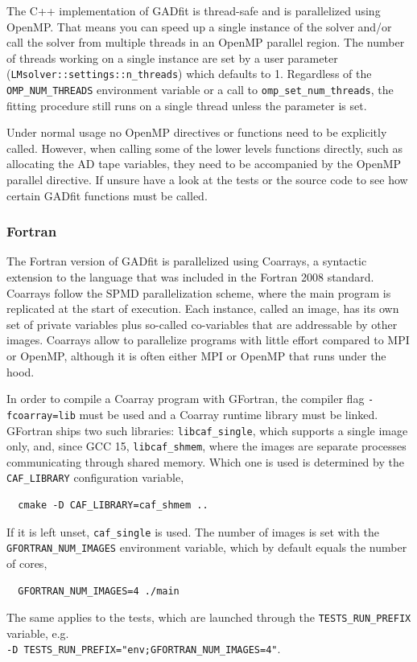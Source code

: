\documentclass{article}
\begin{document}
The C++ implementation of GADfit is thread-safe and is parallelized using OpenMP. That means you can speed up a single instance of the solver and/or call the solver from multiple threads in an OpenMP parallel region. The number of threads working on a single instance are set by a user parameter\\
(\verb+LMsolver::settings::n_threads+) which defaults to 1. Regardless of the \verb+OMP_NUM_THREADS+ environment variable or a call to \verb+omp_set_num_threads+, the fitting procedure still runs on a single thread unless the parameter is set.

Under normal usage no OpenMP directives or functions need to be explicitly called. However, when calling some of the lower levels functions directly, such as allocating the AD tape variables, they need to be accompanied by the OpenMP parallel directive. If unsure have a look at the tests or the source code to see how certain GADfit functions must be called.

\subsubsection{\label{sec:parallelism_fortran}Fortran}

The Fortran version of GADfit is parallelized using Coarrays, a syntactic extension to the language that was included in the Fortran 2008 standard. Coarrays follow the SPMD parallelization scheme, where the main program is replicated at the start of execution. Each instance, called an image, has its own set of private variables plus so-called co-variables that are addressable by other images. Coarrays allow to parallelize programs with little effort compared to MPI or OpenMP, although it is often either MPI or OpenMP that runs under the hood.

In order to compile a Coarray program with GFortran, the compiler flag \texttt{-fcoarray=lib} must be used and a Coarray runtime library must be linked. GFortran ships two such libraries: \verb+libcaf_single+, which supports a single image only, and, since GCC 15, \verb+libcaf_shmem+, where the images are separate processes communicating through shared memory. Which one is used is determined by the \verb+CAF_LIBRARY+ configuration variable,
\begin{verbatim}
  cmake -D CAF_LIBRARY=caf_shmem ..
\end{verbatim}
If it is left unset, \verb+caf_single+ is used. The number of images is set with the \verb+GFORTRAN_NUM_IMAGES+ environment variable, which by default equals the number of cores,
\begin{verbatim}
  GFORTRAN_NUM_IMAGES=4 ./main
\end{verbatim}
The same applies to the tests, which are launched through the \verb+TESTS_RUN_PREFIX+ variable, e.g.\ \\
\verb+-D TESTS_RUN_PREFIX="env;GFORTRAN_NUM_IMAGES=4"+.
\end{document}
